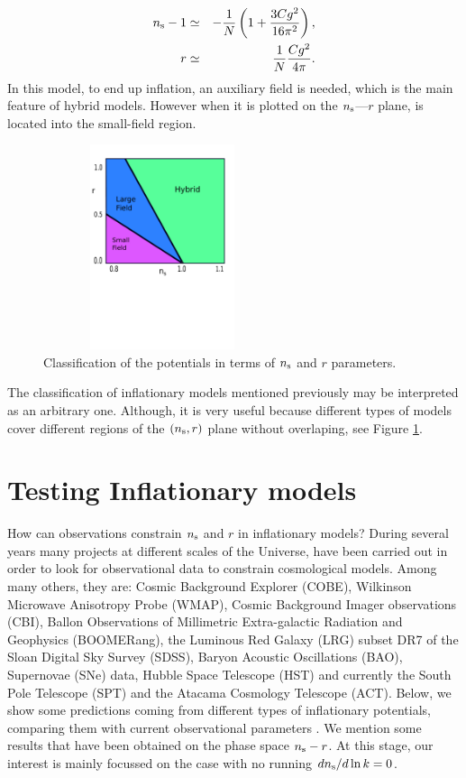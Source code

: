 \documentclass{rmaa}
\def\bea{\begin{eqnarray}}
\def\eea{\end{eqnarray}}
\begin{document}
\bea
n_{\rm s}-1&\simeq& -\frac{1}{N}\left(1+\frac{3C g^2}{16 \pi^2}\right), \nonumber \\
r&\simeq& \frac{1}{N}{Cg^2\over 4\pi}.
 \eea
%
In this model, to end up inflation, an auxiliary field is needed, which is the main feature of
hybrid models. However when it is plotted on the $n_{\rm s}$---$r$ plane, is located into the
small-field region.
\\

\begin{figure}[h!]
\begin{center}
  \includegraphics[trim = 0mm 100mm 0mm 10mm, clip, width=7cm, height=6cm]{zoo.pdf}
	\caption{Classification of the
potentials in terms of $n_{\rm s}$ and $r$ parameters. }
\label{fig:parameters}
\end{center}
\end{figure}

The classification of inflationary models mentioned previously may be interpreted as an 
arbitrary one. Although, it is very useful because different types of models cover different 
regions of the $(n_{\rm s}, r)$ plane without overlaping, see Figure \ref{fig:parameters}.



\section{Testing Inflationary models}


How can observations constrain $n_{\rm s}$ and $r$ in inflationary models?
During several years many projects at different scales of the Universe, have been carried 
out in order to look for observational data to constrain cosmological models. 
Among many others, they are:  
Cosmic Background Explorer (COBE), Wilkinson Microwave Anisotropy Probe (WMAP),
Cosmic Background Imager observations (CBI), Ballon Observations of Millimetric Extra-galactic 
Radiation and Geophysics (BOOMERang), the Luminous Red Galaxy (LRG) subset DR7 of the Sloan
Digital Sky Survey (SDSS), Baryon Acoustic Oscillations (BAO), Supernovae (SNe) data, 
Hubble Space Telescope (HST) and currently the South Pole Telescope (SPT) and the 
Atacama Cosmology Telescope (ACT).
Below, we show some predictions coming from different types of inflationary potentials, 
comparing them with current observational parameters \citep{Mortonson11}.
We mention some results that have been obtained on the 
phase space $n_{\rm s}-r$. At this stage, our interest is mainly focussed 
on the case with no running $dn_{\rm s}/d\ln k =0$.
 \\
 
\end{document}
